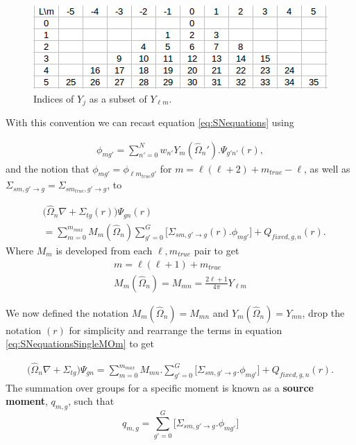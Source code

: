 \documentclass[11pt,letterpaper,titlepage]{article}
\numberwithin{equation}{section}
\begin{document}
\begin{figure}[h]
    \centering
    \includegraphics[width=0.5\linewidth]{Figures/jindex.png}
    \caption{Indices of $Y_j$ as a subset of $Y_{\ell m}$.}
    \label{fig:indices}
\end{figure}

\noindent With this convention we can recast equation \ref{eq:SNequations} using 

\begin{align*}
\phi_{mg'} = \sum_{n'=0}^{N}
w_{n'}
Y_{m}(\hat{\Omega}_n')
. \Psi_{g'n'}(r),
\end{align*}
and the notion that $\phi_{mg'} = \phi_{\ell m_{true}g'}$ for $m=\ell(\ell+2)+m_{true}-\ell$, as well as $\Sigma_{sm,g'{\to}g} = \Sigma_{sm_{true},g'{\to}g}$, to

\begin{equation} \label{eq:SNequationsSingleMOm}
\begin{aligned}
&\biggr(\hat{\Omega}_n\nabla +\Sigma_{tg} (r)\biggr)  \Psi_{gn} (r)\\
&=       
\sum_{m=0}^{m_{max}}
M_{m}(\hat{\Omega}_n)
\sum_{g'=0}^{G} \biggr[  
\Sigma_{sm,g'{\to}g} (r)
. \phi_{mg'}
\biggr]
+  Q_{fixed,g,n} (r).
\end{aligned}
\end{equation}
\newline
Where $M_m$ is developed from each $\ell,m_{true}$ pair to get
\begin{equation} \label{eq:rough_m2d}
\begin{aligned}
m=\ell(\ell+1)+ m_{true}\\
M_m(\hat{\Omega}_n) = M_{mn}= \frac{2\ell+1}{4\pi}Y_{\ell m}
\end{aligned}
\end{equation}

We now defined the notation $M_m(\hat{\Omega}_n)=M_{mn}$ and $Y_m (\hat{\Omega}_n) = Y_{mn}$, drop the notation $(r)$ for simplicity and rearrange the terms in equation \ref{eq:SNequationsSingleMOm} to get

\begin{equation} \label{eq:SNequationsSingleMOmReArr}
\begin{aligned}
\biggr(\hat{\Omega}_n\nabla +\Sigma_{tg} \biggr)  \Psi_{gn} 
=    \sum_{m=0}^{m_{max}}     
M_{mn}
.
\sum_{g'=0}^{G}
\biggr[
\Sigma_{sm,g'{\to}g} 
. \phi_{mg'}
\biggr]
+  Q_{fixed,g,n} (r).
\end{aligned}
\end{equation}
\newline
The summation over groups for a specific moment is known as a \textbf{source moment}, $q_{m,g}$, such that
\begin{equation} \label{eq:sourcemoment}
q_{m,g}=
\sum_{g'=0}^{G}
\biggr[
\Sigma_{sm,g'{\to}g} 
. \phi_{mg'}
\biggr]
\end{equation} 
\end{document}
